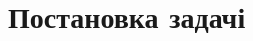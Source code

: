 \documentclass[14pt,a4paper]{extarticle}
\newcounter{e}
\numberwithin{equation}{section}
\numberwithin{figure}{section}
\begin{document}
	\begin{comment}
	"""
	http://repository.dnu.dp.ua:1100/upload/ddcba97cf65d7af08acc8b934080e148.pdf
	
	1) визначати механічні та теплофізичні властивості матеріалів, ідентифікув ати полімерні і композитні матеріали, біоматеріали, п'єзокерам ічні матеріали;
	2) розв’язувати задачі сейсморозвідки , а саме визначати розташування й
	потужності покладів корисних копалин за відбитими від родовища звуковими сиг
	налами;
	3) розв’язувати проблеми неруйнівного контролю, а саме визначати розташування й конфігурацію дефекту за виміряним на поверхні тіла полем пружних
	переміщень або за резонансними частотами;
	4) моделювати явища акустичної емісії та встановлювати зв'язок між осн ов
	ними характеристиками емісії та хар актеристиками напруженого стану, д ослід
	ження цього явища дозволяє виявити стан конструкції, що передує її руйнуванню;
	5) розв’язувати задачі рентгенівської й акустичної томографії.
	Вибираючи математичну модель, звичайно фіксують два етапи:
	1) вибір структури оператора A, що здійснює відображення входу xt на
	вихід yt;
	""'"
	content...
	\end{comment}


	
	\newpage
	\thispagestyle{empty}
	\section{Постановка задачі} 
	
	
	\begin{comment}
	"""
	Відповідно до поняття, уведеного на початку століття Ж. Адамаром, задачу
	z  Ru називають коректно поставленою, якщо вона задовольняє тр и умови:
	1) за кожного u U розв'язок задачі існує;
	2) розв'язок є єдиний за кожного u U ;
	3) розв'язок є стійкий до малих варіацій величини u , тобто достатньо малим
	зміненням величини u відповідають як завгодно малі зміни величини z [1, 7].
	Якщо задача не задовольняє хоча б одну із зазначених умов, то її називають некоректно поставленою.
	Очевидно тепер, що обернені задачі в розглянутих прикладах відносять до
	числа некоректно поставлених, оскільки в них порушується третя, а мо жливо, і
	перша із зазначених вище умов. Некоректність постановки обернен ої задачі і є її
	математична особливість. Якщо для пошуку наближеного розв’язку оберненої з адачі застосовувати будь-який класичний алгоритм формально, не враховуючи н екоректність постановки задачі, то є великий ризик отримати результат, який не
	має ні наукової, ні прикладної цінності.
	"""
	\end{comment}
	
\end{document}
